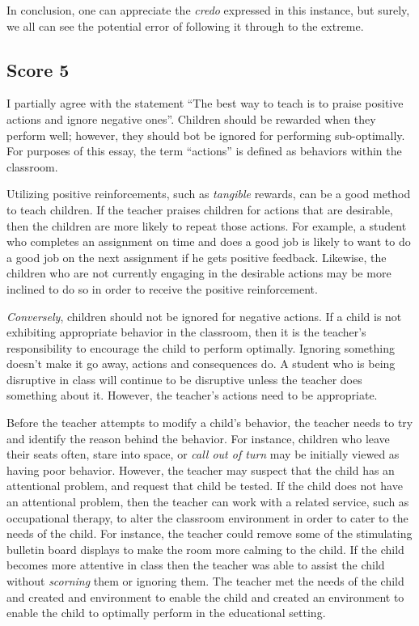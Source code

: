 In conclusion, one can appreciate the \emph{credo} expressed in this instance, but surely, we all can see the potential error of following it through to the extreme.





\subsection{Score 5}
I partially agree with the statement ``The best way to teach is to praise positive actions and ignore negative ones''.
Children should be rewarded when they perform well;
however, they should bot be ignored for performing sub-optimally.
For purposes of this essay, the term ``actions'' is defined as behaviors within the classroom.

Utilizing positive reinforcements, such as \emph{tangible} rewards, can be a good method to teach children.
If the teacher praises children for actions that are desirable, then the children are more likely to repeat those actions.
For example, a student who completes an assignment on time and does a good job is likely to want to do a good job on the next assignment if he gets positive feedback.
Likewise, the children who are not currently engaging in the desirable actions may be more inclined to do so in order to receive the positive reinforcement.

\emph{Conversely}, children should not be ignored for negative actions.
If a child is not exhibiting appropriate behavior in the classroom, then it is the teacher's responsibility to encourage the child to perform optimally.
Ignoring something doesn't make it go away, actions and consequences do.
A student who is being disruptive in class will continue to be disruptive unless the teacher does something about it.
However, the teacher's actions need to be appropriate.

Before the teacher attempts to modify a child's behavior, the teacher needs to try and identify the reason behind the behavior.
For instance, children who leave their seats often, stare into space, or \emph{call out of turn} may be initially viewed as having poor behavior.
However, the teacher may suspect that the child has an attentional problem, and request that child be tested.
If the child does not have an attentional problem, then the teacher can work with a related service, such as occupational therapy, to alter the classroom environment in order to cater to the needs of the child.
For instance, the teacher could remove some of the stimulating bulletin board displays to make the room more calming to the child.
If the child becomes more attentive in class then the teacher was able to assist the child without \emph{scorning} them or ignoring them.
The teacher met the needs of the child and created and environment to enable the child and created an environment to enable the child to optimally perform in the educational setting.

